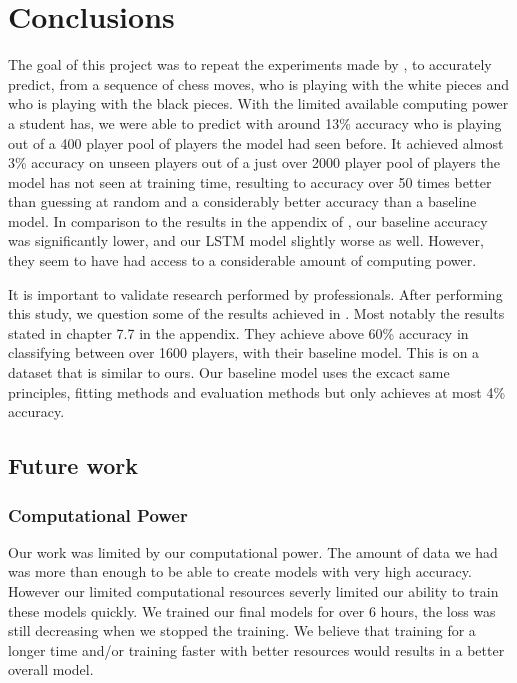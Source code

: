 \newpage
\section{Conclusions}
The goal of this project was to repeat the experiments made by \cite{main_article}, to accurately predict, from a sequence of chess moves, who is playing with the white pieces and who is playing with the black pieces. With the limited available computing power a student has, we were able to predict with around 13\% accuracy who is playing out of a 400 player pool of players the model had seen before. It achieved almost 3\% accuracy on unseen players out of a just over 2000 player pool of players the model has not seen at training time, resulting to accuracy over 50 times better than guessing at random and a considerably better accuracy than a baseline model. In comparison to the results in the appendix of \cite{main_article}, our baseline accuracy was significantly lower, and our LSTM model slightly worse as well. However, they seem to have had access to a considerable amount of computing power.
\medskip\par 
It is important to validate research performed by professionals. After performing this study, we question some of the results achieved in \cite{main_article}. Most notably the results stated in chapter 7.7 in the appendix. They achieve above 60\% accuracy in classifying between over 1600 players, with their baseline model.
This is on a dataset that is similar to ours. Our baseline model uses the excact same principles, fitting methods and evaluation methods but only achieves at most 4\% accuracy.

\subsection{Future work}
\subsubsection{Computational Power}
Our work was limited by our computational power. The amount of data we had was more than enough to be able to create models with very high accuracy. However our limited computational resources severly limited our ability to train these models quickly.
We trained our final models for over 6 hours, the loss was still decreasing when we stopped the training.
We believe that training for a longer time and/or training faster with better resources would results in a better overall model.
